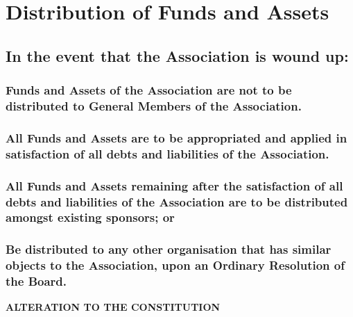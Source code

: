 \documentclass{article}
\newenvironment{subs}
  {\adjustwidth{2em}{0pt}}
  {\endadjustwidth}
\begin{document}
\section{Distribution of Funds and Assets}
\begin{subs}
\subsection{In the event that the Association is wound up:}
\begin{subs}
\subsubsection{Funds and Assets of the Association are not to be distributed to General Members of the Association.}
\subsubsection{All Funds and Assets are to be appropriated and applied in satisfaction of all debts and liabilities of the Association.}
\subsubsection{All Funds and Assets remaining after the satisfaction of all debts and liabilities of the Association are to be distributed amongst existing sponsors; or}
\subsubsection{Be distributed to any other organisation that has similar objects to the Association, upon an Ordinary Resolution of the Board.}
\end{subs}
\end{subs}
\newpage

\vspace{5mm}
{\large\bf ALTERATION TO THE CONSTITUTION\par}
\hrulefill
\end{document}
